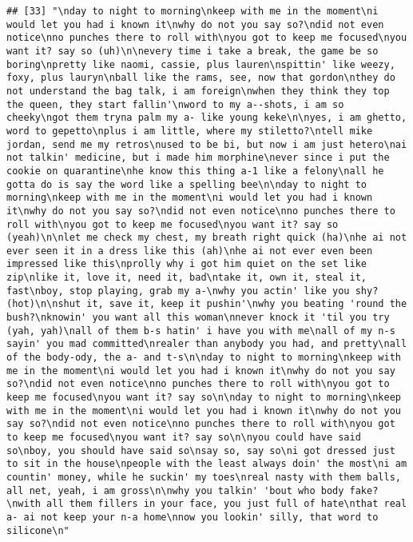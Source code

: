 \documentclass[]{article}
\begin{document}
\begin{verbatim}
## [33] "\nday to night to morning\nkeep with me in the moment\ni would let you had i known it\nwhy do not you say so?\ndid not even notice\nno punches there to roll with\nyou got to keep me focused\nyou want it? say so (uh)\n\nevery time i take a break, the game be so boring\npretty like naomi, cassie, plus lauren\nspittin' like weezy, foxy, plus lauryn\nball like the rams, see, now that gordon\nthey do not understand the bag talk, i am foreign\nwhen they think they top the queen, they start fallin'\nword to my a--shots, i am so cheeky\ngot them tryna palm my a- like young keke\n\nyes, i am ghetto, word to gepetto\nplus i am little, where my stiletto?\ntell mike jordan, send me my retros\nused to be bi, but now i am just hetero\nai not talkin' medicine, but i made him morphine\never since i put the cookie on quarantine\nhe know this thing a-1 like a felony\nall he gotta do is say the word like a spelling bee\n\nday to night to morning\nkeep with me in the moment\ni would let you had i known it\nwhy do not you say so?\ndid not even notice\nno punches there to roll with\nyou got to keep me focused\nyou want it? say so (yeah)\n\nlet me check my chest, my breath right quick (ha)\nhe ai not ever seen it in a dress like this (ah)\nhe ai not ever even been impressed like this\nprolly why i got him quiet on the set like zip\nlike it, love it, need it, bad\ntake it, own it, steal it, fast\nboy, stop playing, grab my a-\nwhy you actin' like you shy? (hot)\n\nshut it, save it, keep it pushin'\nwhy you beating 'round the bush?\nknowin' you want all this woman\nnever knock it 'til you try (yah, yah)\nall of them b-s hatin' i have you with me\nall of my n-s sayin' you mad committed\nrealer than anybody you had, and pretty\nall of the body-ody, the a- and t-s\n\nday to night to morning\nkeep with me in the moment\ni would let you had i known it\nwhy do not you say so?\ndid not even notice\nno punches there to roll with\nyou got to keep me focused\nyou want it? say so\n\nday to night to morning\nkeep with me in the moment\ni would let you had i known it\nwhy do not you say so?\ndid not even notice\nno punches there to roll with\nyou got to keep me focused\nyou want it? say so\n\nyou could have said so\nboy, you should have said so\nsay so, say so\ni got dressed just to sit in the house\npeople with the least always doin' the most\ni am countin' money, while he suckin' my toes\nreal nasty with them balls, all net, yeah, i am gross\n\nwhy you talkin' 'bout who body fake?\nwith all them fillers in your face, you just full of hate\nthat real a- ai not keep your n-a home\nnow you lookin' silly, that word to silicone\n"                                                                                                                                                                                                                                                                                                                                                                                                                                                                                                                                                                                                                                                                                                 
\end{verbatim}
\end{document}
